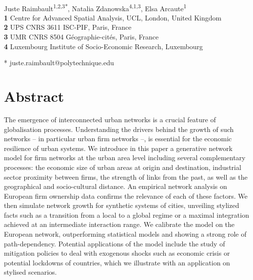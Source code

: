 \documentclass[10pt,letterpaper]{article}
\begin{document}
\justify
\vspace*{0.2in}

\begin{flushleft}
{\Large
\textbf{} %
}
\newline
\\
Juste Raimbault\textsuperscript{1,2,3*},
Natalia Zdanowska\textsuperscript{4,1,3},
Elsa Arcaute\textsuperscript{1}
\\
\bigskip
\textbf{1} Centre for Advanced Spatial Analysis, UCL, London, United Kingdom
\\
\textbf{2} UPS CNRS 3611 ISC-PIF, Paris, France
\\
\textbf{3} UMR CNRS 8504 G{\'e}ographie-cit{\'e}s, Paris, France
\\
\textbf{4} Luxembourg Institute of Socio-Economic Research, Luxembourg

\bigskip

* juste.raimbault@polytechnique.edu

\end{flushleft}


\section*{Abstract}
The emergence of interconnected urban networks is a crucial feature of globalisation processes. Understanding the drivers behind the growth of such networks -- in particular urban firm networks --, is essential for the economic resilience of urban systems. We introduce in this paper a generative network model for firm networks at the urban area level including several complementary processes: the economic size of urban areas at origin and destination, industrial sector proximity between firms, the strength of links from the past, as well as the geographical and socio-cultural distance. An empirical network analysis on European firm ownership data confirms the relevance of each of these factors. We then simulate network growth for synthetic systems of cities, unveiling stylized facts such as a transition from a local to a global regime or a maximal integration achieved at an intermediate interaction range. We calibrate the model on the European network, outperforming statistical models and showing a strong role of path-dependency. Potential applications of the model include the study of mitigation policies to deal with exogenous shocks such as economic crisis or potential lockdowns of countries, which we illustrate with an application on stylised scenarios.
\end{document}
